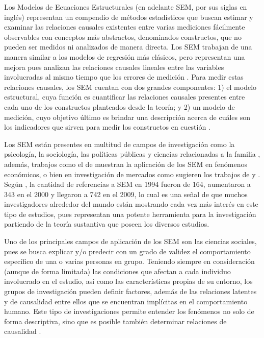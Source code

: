 \documentclass[english]{revcoles}
\begin{document}
Los Modelos de Ecuaciones Estructurales (en adelante SEM, por sus siglas en inglés) representan un compendio de métodos estadísticos que buscan estimar y examinar las relaciones causales existentes entre varias mediciones fácilmente observables con conceptos más abstractos, denominados constructos, que no pueden ser medidos ni analizados de manera directa. Los SEM trabajan de una manera similar a los modelos de regresión más clásicos, pero representan una mejora pues analizan las relaciones causales lineales entre las variables involucradas al mismo tiempo que los errores de medición \cite{Beran2010}. Para medir estas relaciones causales, los SEM cuentan con dos grandes componentes: 1) el modelo estructural, cuya función es cuantificar las relaciones causales presentes entre cada uno de los constructos planteados desde la teoría; y 2) un modelo de medición, cuyo objetivo último es brindar una descripción acerca de cuáles son los indicadores que sirven para medir los constructos en cuestión \cite{Kaplan2012}.

Los SEM están presentes en multitud de campos de investigación como la psicología, la sociología, las políticas públicas y ciencias relacionadas a la familia \cite{Tarka2018}, además, trabajos como el de  muestran la aplicación de los SEM en fenómenos económicos, o bien en investigación de mercados como sugieren los trabajos de  y . Según , la cantidad de referencias a SEM en 1994 fueron de 164, aumentaron a 343 en el 2000 y llegaron a 742 en el 2009, lo cual es una señal de que muchos investigadores alrededor del mundo están mostrando cada vez más interés en este tipo de estudios, pues representan una potente herramienta para la investigación partiendo de la teoría sustantiva que poseen los diversos estudios.

Uno de los principales campos de aplicación de los SEM son las ciencias sociales, pues se busca explicar y/o predecir con un grado de validez el comportamiento específico de una o varias personas en grupo. Teniendo siempre en consideración (aunque de forma limitada) las condiciones que afectan a cada individuo involucrado en el estudio, así como las características propias de su entorno, los grupos de investigación pueden definir factores, además de las relaciones latentes y de causalidad entre ellos que se encuentran implícitas en el comportamiento humano. Este tipo de investigaciones permite entender los fenómenos no solo de forma descriptiva, sino que es posible también determinar relaciones de causalidad \cite{Tarka2018}.
\end{document}
